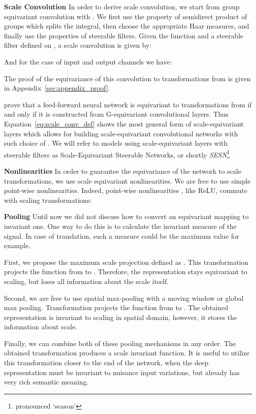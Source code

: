 \documentclass{article} \usepackage{multirow}
\def\Apref#1{Appendix~\ref{#1}}
\def\Eqref#1{Equation~\ref{#1}}
\begin{document}
\textbf{Scale Convolution}
In order to derive scale convolution, we start from group equivariant convolution with . We first 
use the property of semidirect product of groups which splits the integral, then choose the appropriate 
Haar measures, and 
finally use the properties of steerable filters.
Given the function  and a steerable filter  defined on , 
a scale convolution is given by:


And for the case of  input and  output channels we have:

The proof of the equivariance of this convolution to transformations from  is given in \Apref{sec:appendix_proof}. 

\citet{kondor2018generalization} prove that a feed-forward neural network is 
equivariant to transformations from  if and only if it is constructed from G-equivariant
convolutional layers. Thus \Eqref{eq:scale_conv_def} shows the most general 
form of scale-equivariant layers which allows for 
building scale-equivariant convolutional networks with such choice of . 
We will refer to models using scale-equivariant layers with steerable filters as Scale-Equivariant Steerable Networks, 
or shortly \textit{SESN}\footnote{pronounced `season'}

\textbf{Nonlinearities}
In order to guarantee the equivariance of the network to scale transformations, 
we use scale equivariant nonlinearities. We are free to use simple point-wise nonlinearities.
Indeed, point-wise nonlinearities , like ReLU, commute with scaling transformations: 


\textbf{Pooling}
Until now we did not discuss how to convert an equivariant mapping to invariant one. 
One way to do this is to calculate the invariant measure of the signal. 
In case of translation, such a measure could be the maximum value for example. 

First, we propose the maximum scale projection defined as 
. This transformation projects the function  from  
to . Therefore, the representation stays equivariant to scaling, but loses all information about the scale itself.

Second, we are free to use spatial max-pooling with a moving window or global max pooling.
Transformation  projects the function  from  
to . The obtained representation is invariant to scaling in spatial domain, 
however, it stores the information about scale.

Finally, we can combine both of these pooling mechanisms in any order. 
The obtained transformation produces a scale invariant function. It is useful 
to utilize this transformation closer to the end of the network, when the deep representation must be invariant to nuisance input variations, but already has very rich semantic meaning. 
\end{document}
